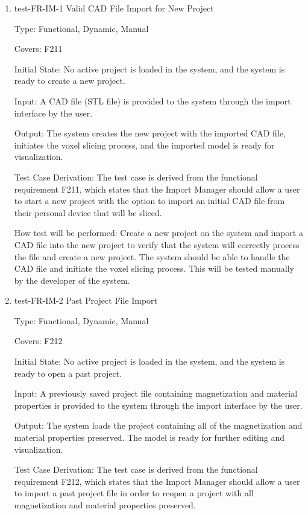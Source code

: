 \documentclass[12pt, titlepage]{article}
\begin{document}
\begin{enumerate}

\item{test-FR-IM-1 Valid CAD File Import for New Project\\}

Type: Functional, Dynamic, Manual

Covers: F211
					
Initial State: No active project is loaded in the system, and the system is ready to create a new project.
					
Input: A CAD file (STL file) is provided to the system through the import interface by the user.
					
Output: The system creates the new project with the imported CAD file, initiates the voxel slicing process, and the imported model is ready for visualization.

Test Case Derivation: The test case is derived from the functional requirement F211, which states that the Import Manager should allow a user to start a new project with the option to import an initial CAD file from their personal device that will be sliced.
					
How test will be performed: Create a new project on the system and import a CAD file into the new project to verify that the system will correctly process the file and create a new project. The system should be able to handle the CAD file and initiate the voxel slicing process. This will be tested manually by the developer of the system.

\item{test-FR-IM-2 Past Project File Import\\}

Type: Functional, Dynamic, Manual

Covers: F212
					
Initial State: No active project is loaded in the system, and the system is ready to open a past project.
					
Input: A previously saved project file containing magnetization and material properties is provided to the system through the import interface by the user.
					
Output: The system loads the project containing all of the magnetization and material properties preserved. The model is ready for further editing and visualization.

Test Case Derivation: The test case is derived from the functional requirement F212, which states that the Import Manager should allow a user to import a past project file in order to reopen a project with all magnetization and material properties preserved.
					

\end{enumerate}
\end{document}
